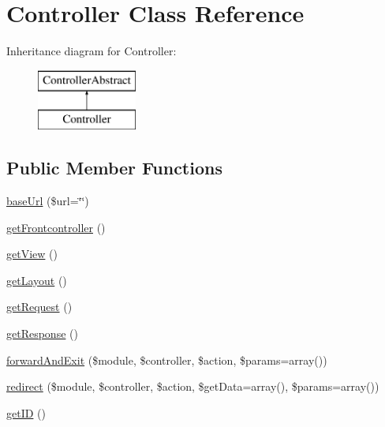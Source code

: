\hypertarget{class_anemo_1_1_controller}{
\section{Controller Class Reference}
\label{class_anemo_1_1_controller}
}
Inheritance diagram for Controller:\begin{figure}[H]
\begin{center}
\leavevmode
\includegraphics[height=2.000000cm]{class_anemo_1_1_controller}
\end{center}
\end{figure}
\subsection*{Public Member Functions}
\begin{DoxyCompactItemize}
\item 
\hyperlink{class_anemo_1_1_controller_ad011c3639122bebffc3065dfda195ba8}{baseUrl} (\$url=\char`\"{}\char`\"{})
\item 
\hyperlink{class_anemo_1_1_controller_aa182525e446da02ad9af5d903f3f8f66}{getFrontcontroller} ()
\item 
\hyperlink{class_anemo_1_1_controller_a50677812ea3f0258f7d03bbac5265413}{getView} ()
\item 
\hyperlink{class_anemo_1_1_controller_a5c316721766e9cd8ad5d0085e64048ed}{getLayout} ()
\item 
\hyperlink{class_anemo_1_1_controller_adf1a35ad20e475c59cc0967d5764aa22}{getRequest} ()
\item 
\hyperlink{class_anemo_1_1_controller_a6c907e8af775e517a77037dd0164222f}{getResponse} ()
\item 
\hyperlink{class_anemo_1_1_controller_ae4da108649cdc479a5c1a40b99c74ec7}{forwardAndExit} (\$module, \$controller, \$action, \$params=array())
\item 
\hyperlink{class_anemo_1_1_controller_a32270256b7eef05b5fcec92a7e3dd7e8}{redirect} (\$module, \$controller, \$action, \$getData=array(), \$params=array())
\item 
\hyperlink{class_anemo_1_1_controller_a30dd7fff4fec7a39f9be9d27d4b22a59}{getID} ()
\end{DoxyCompactItemize}
